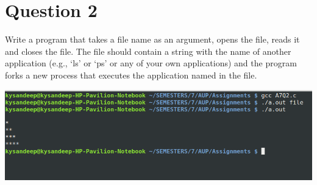 \documentclass[main.tex]{subfiles}
\begin{document}
\section{Question 2}
Write a program that takes a file name as an argument, opens the file, reads it
and closes the file. The file should contain a string with the name of another
application (e.g., `ls' or `ps' or any of your own applications) and the program
forks a new process that executes the application named in the file.


\includegraphics[width=\textwidth]{figures/2_output.png}
\end{document}
